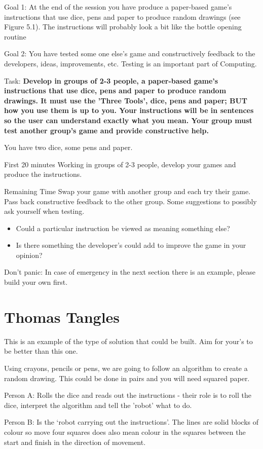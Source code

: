 Goal 1: At the end of the session you have produce a paper-based game's instructions that use dice, pens and paper to produce random drawings (see Figure 5.1). The instructions will probably look a bit like the bottle opening routine 

Goal 2: You have tested some one else's game and constructively feedback to the developers, ideas, improvements, etc. Testing is an important part of Computing.


Task: \textbf{Develop in groups of 2-3 people, a paper-based game's instructions that use dice, pens and paper to produce random drawings. It must use the 'Three Tools', dice, pens and paper; BUT how you use them is up to you. Your instructions will be in sentences so the user can understand exactly what you mean. Your group must test another group's game and provide constructive help.} 


You have two dice, some pens and paper.

First 20 minutes
Working in groups of 2-3 people, develop your games and produce the instructions.

Remaining Time
Swap your game with another group and each try their game. Pass back constructive feedback to the other group. Some suggestions to possibly ask yourself when testing.
\begin{itemize}
    \item Could a particular instruction be viewed as meaning something else?
    \item Is there something the developer's could add to improve the game in your opinion?
\end{itemize}

Don't panic: In case of emergency in the next section there is an example, please build your own first.


\section{Thomas Tangles}
This is an example of the type of solution that could be built. Aim for your's to be better than this one.

Using crayons, pencils or pens, we are going to follow an algorithm to create a random drawing. This could be done in pairs and you will need squared paper. 

Person A: Rolls the dice and reads out the instructions - their role is to roll the dice, interpret the algorithm and tell the 'robot' what to do.

Person B: Is the ‘robot carrying out the instructions'. The lines are solid blocks of colour so move four squares does also mean colour in the squares between the start and finish in the direction of movement.

